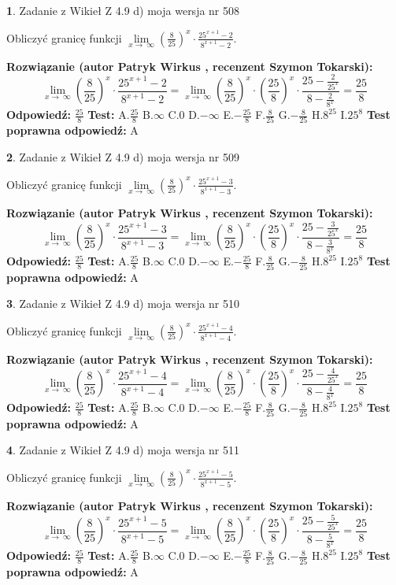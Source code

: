 \documentclass[12pt, a4paper]{article}
\theoremstyle{definition} %
\newtheorem{zad}{}
\newcommand{\zadStart}[1]{\begin{zad}#1\newline}
\newcommand{\zadStop}{\end{zad}}
\newcommand{\rozwStart}[2]{\noindent \textbf{Rozwiązanie (autor #1 , recenzent #2): }\newline}
\newcommand{\rozwStop}{\newline}
\newcommand{\odpStart}{\noindent \textbf{Odpowiedź:}\newline}
\newcommand{\odpStop}{\newline}
\newcommand{\testStart}{\noindent \textbf{Test:}\newline}
\newcommand{\testStop}{\newline}
\newcommand{\kluczStart}{\noindent \textbf{Test poprawna odpowiedź:}\newline}
\newcommand{\kluczStop}{\newline}
\begin{document}
\zadStart{Zadanie z Wikieł Z 4.9 d) moja wersja nr 508}


Obliczyć granicę funkcji  $\lim\limits_{x\to\ \infty}(\frac{8}{25})^{x}\cdot\frac{25^{x+1}-2}{8^{x+1}-2}$.
\zadStop
\rozwStart{Patryk Wirkus}{Szymon Tokarski}
$$\lim\limits_{x\to\ \infty}(\frac{8}{25})^{x}\cdot\frac{25^{x+1}-2}{8^{x+1}-2}=\lim\limits_{x\to\ \infty}(\frac{8}{25})^{x}\cdot(\frac{25}{8})^{x} \cdot \frac{25-\frac{2}{25^{x}}}{8-\frac{2}{8^{x}}} = \frac{25}{8}$$
\rozwStop
\odpStart
$\frac{25}{8}$
\odpStop
\testStart
A.$\frac{25}{8}$ B.$\infty$ C.$0$ D.$-\infty$ E.$-\frac{25}{8}$
F.$\frac{8}{25}$ G.$-\frac{8}{25}$
H.$8^{25}$
I.$25^{8}$
\testStop
\kluczStart
A
\kluczStop



\zadStart{Zadanie z Wikieł Z 4.9 d) moja wersja nr 509}


Obliczyć granicę funkcji  $\lim\limits_{x\to\ \infty}(\frac{8}{25})^{x}\cdot\frac{25^{x+1}-3}{8^{x+1}-3}$.
\zadStop
\rozwStart{Patryk Wirkus}{Szymon Tokarski}
$$\lim\limits_{x\to\ \infty}(\frac{8}{25})^{x}\cdot\frac{25^{x+1}-3}{8^{x+1}-3}=\lim\limits_{x\to\ \infty}(\frac{8}{25})^{x}\cdot(\frac{25}{8})^{x} \cdot \frac{25-\frac{3}{25^{x}}}{8-\frac{3}{8^{x}}} = \frac{25}{8}$$
\rozwStop
\odpStart
$\frac{25}{8}$
\odpStop
\testStart
A.$\frac{25}{8}$ B.$\infty$ C.$0$ D.$-\infty$ E.$-\frac{25}{8}$
F.$\frac{8}{25}$ G.$-\frac{8}{25}$
H.$8^{25}$
I.$25^{8}$
\testStop
\kluczStart
A
\kluczStop



\zadStart{Zadanie z Wikieł Z 4.9 d) moja wersja nr 510}


Obliczyć granicę funkcji  $\lim\limits_{x\to\ \infty}(\frac{8}{25})^{x}\cdot\frac{25^{x+1}-4}{8^{x+1}-4}$.
\zadStop
\rozwStart{Patryk Wirkus}{Szymon Tokarski}
$$\lim\limits_{x\to\ \infty}(\frac{8}{25})^{x}\cdot\frac{25^{x+1}-4}{8^{x+1}-4}=\lim\limits_{x\to\ \infty}(\frac{8}{25})^{x}\cdot(\frac{25}{8})^{x} \cdot \frac{25-\frac{4}{25^{x}}}{8-\frac{4}{8^{x}}} = \frac{25}{8}$$
\rozwStop
\odpStart
$\frac{25}{8}$
\odpStop
\testStart
A.$\frac{25}{8}$ B.$\infty$ C.$0$ D.$-\infty$ E.$-\frac{25}{8}$
F.$\frac{8}{25}$ G.$-\frac{8}{25}$
H.$8^{25}$
I.$25^{8}$
\testStop
\kluczStart
A
\kluczStop



\zadStart{Zadanie z Wikieł Z 4.9 d) moja wersja nr 511}


Obliczyć granicę funkcji  $\lim\limits_{x\to\ \infty}(\frac{8}{25})^{x}\cdot\frac{25^{x+1}-5}{8^{x+1}-5}$.
\zadStop
\rozwStart{Patryk Wirkus}{Szymon Tokarski}
$$\lim\limits_{x\to\ \infty}(\frac{8}{25})^{x}\cdot\frac{25^{x+1}-5}{8^{x+1}-5}=\lim\limits_{x\to\ \infty}(\frac{8}{25})^{x}\cdot(\frac{25}{8})^{x} \cdot \frac{25-\frac{5}{25^{x}}}{8-\frac{5}{8^{x}}} = \frac{25}{8}$$
\rozwStop
\odpStart
$\frac{25}{8}$
\odpStop
\testStart
A.$\frac{25}{8}$ B.$\infty$ C.$0$ D.$-\infty$ E.$-\frac{25}{8}$
F.$\frac{8}{25}$ G.$-\frac{8}{25}$
H.$8^{25}$
I.$25^{8}$
\testStop
\kluczStart
A
\kluczStop
\end{document}
